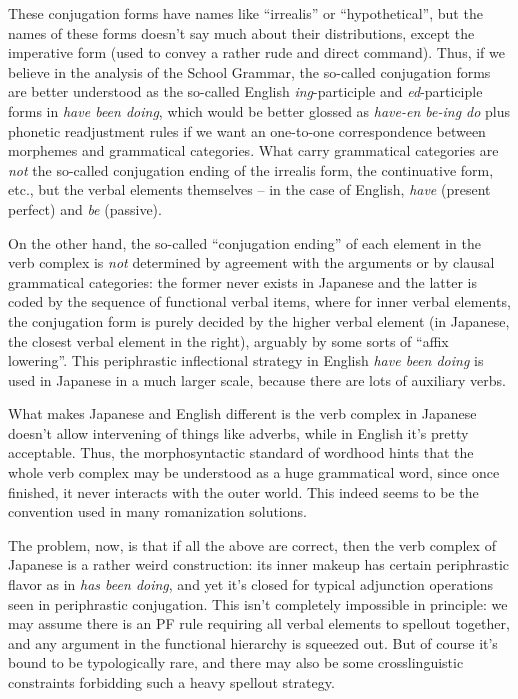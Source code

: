 \documentclass[UTF8, a4paper, oneside, scheme=plain]{ctexart}
\newcommand{\corpus}[1]{\emph{#1}}
\begin{document}
These conjugation forms have names like ``irrealis'' or ``hypothetical'',
but the names of these forms doesn't say much about their distributions,
except the imperative form (used to convey a rather rude and direct command).
Thus, if we believe in the analysis of the School Grammar,
the so-called conjugation forms are better understood as the 
so-called English \corpus{ing}-participle and \corpus{ed}-participle forms 
in \corpus{have been doing},
which would be better glossed as 
\corpus{have-en be-ing do} plus phonetic readjustment rules
if we want an one-to-one correspondence between morphemes and grammatical categories.
What carry grammatical categories are \emph{not} the so-called conjugation ending of 
the irrealis form, the continuative form, etc.,
but the verbal elements themselves -- 
in the case of English,
\corpus{have} (present perfect) and \corpus{be} (passive).

On the other hand, the so-called ``conjugation ending'' of each element in the verb complex 
is \emph{not} determined by agreement with the arguments 
or by clausal grammatical categories:
the former never exists in Japanese and the latter is coded by the sequence of functional verbal items,
where for inner verbal elements,
the conjugation form is purely decided 
by the higher verbal element (in Japanese, the closest verbal element in the right), 
arguably by some sorts of ``affix lowering''.
This periphrastic inflectional strategy in English \corpus{have been doing} 
is used in Japanese in a much larger scale,
because there are lots of auxiliary verbs.

What makes Japanese and English different 
is the verb complex in Japanese doesn't allow intervening of things like adverbs,
while in English it's pretty acceptable.
Thus, the morphosyntactic standard of wordhood hints that 
the whole verb complex may be understood as a huge grammatical word,
since once finished, it never interacts with the outer world.
This indeed seems to be the convention used in many romanization solutions.

The problem, now, is that if all the above are correct,
then the verb complex of Japanese is a rather weird construction:
its inner makeup has certain periphrastic flavor as in \corpus{has been doing},
and yet it's closed for typical adjunction operations seen in periphrastic conjugation.
This isn't completely impossible in principle:
we may assume there is an PF rule requiring all verbal elements to spellout together,
and any argument in the functional hierarchy is squeezed out.
But of course it's bound to be typologically rare,
and there may also be some crosslinguistic constraints forbidding such a heavy spellout strategy.
\end{document}
